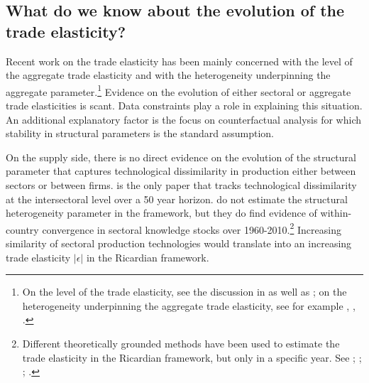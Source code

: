 \documentclass[12pt,twoside,a4paper,notitlepage]{article}
\begin{document}
\subsection{What do we know about the evolution of the trade elasticity?}

Recent work on the trade elasticity has been mainly concerned with the level of the aggregate trade elasticity and with the heterogeneity underpinning the aggregate parameter.\footnote{On the level of the trade elasticity, see the discussion in \cite{Allen2019} as well as \cite{Head2013,Head2014}; on the heterogeneity underpinning the aggregate trade elasticity, see for example \cite{Feenstra2018}, \cite{Bas2017}, \cite{Imbs2015}.}
Evidence on the evolution of either sectoral or aggregate trade elasticities is scant. 
Data constraints play a role in explaining this situation.
An additional explanatory factor is the focus on counterfactual analysis for which stability in structural parameters is the standard assumption.

On the supply side, there is no direct evidence on the evolution of the structural parameter that captures technological dissimilarity in production either between sectors or between firms.  
\cite{Levchenko2016} is the only paper that tracks technological dissimilarity at the intersectoral level over a 50 year horizon.
\cite{Levchenko2016} do not estimate the structural heterogeneity parameter in the \cite{Eaton2002} framework, but they do find evidence of within-country convergence in sectoral knowledge stocks over 1960-2010.\footnote{Different theoretically grounded methods have been used to estimate the trade elasticity in the Ricardian framework, but only in a specific year. See \cite{Eaton2002}; \cite{Simonovska2014}; \cite{Costinot2012a}; \cite{Caliendo2015}.} 
Increasing similarity of sectoral production technologies would translate into an increasing trade elasticity $|\epsilon|$ in the Ricardian framework.
\end{document}
